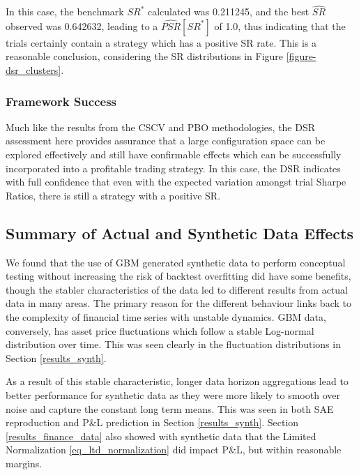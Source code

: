 \documentclass[a4paper,11pt,oneside]{article}
\theoremstyle{plain}
\theoremstyle{definition}
\begin{document}
	
	In this case, the benchmark $SR^*$ calculated was 0.211245, and the best $\widehat{SR}$ observed was 0.642632, leading to a $\widehat{PSR}[SR^*]$ of 1.0, thus indicating that the trials certainly contain a strategy which has a positive SR rate. This is a reasonable conclusion, considering the SR distributions in Figure \ref{figure-dsr_clusters}. \newline

	\subsubsection{Framework Success}
	
	Much like the results from the CSCV and PBO methodologies, the DSR assessment here provides assurance that a large configuration space can be explored effectively and still have confirmable effects which can be successfully incorporated into a profitable trading strategy. In this case, the DSR indicates with full confidence that even with the expected variation amongst trial Sharpe Ratios, there is still a strategy with a positive SR.

	
	\newpage
	\subsection{Summary of Actual and Synthetic Data Effects}\label{results_synth_summary}
	
	We found that the use of GBM generated synthetic data to perform conceptual testing without increasing the risk of backtest overfitting did have some benefits, though the stabler characteristics of the data led to different results from actual data in many areas. The primary reason for the different behaviour links back to the complexity of financial time series with unstable dynamics. GBM data, conversely, has asset price fluctuations which follow a stable Log-normal distribution over time. This was seen clearly in the fluctuation distributions in Section \ref{results_synth}. \newline
	
	As a result of this stable characteristic, longer data horizon aggregations lead to better performance for synthetic data as they were more likely to smooth over noise and capture the constant long term means. This was seen in both SAE reproduction and P\&L prediction in Section \ref{results_synth}. Section \ref{results_finance_data} also showed with synthetic data that the Limited Normalization \eqref{eq_ltd_normalization} did impact P\&L, but within reasonable margins.\newline
\end{document}
